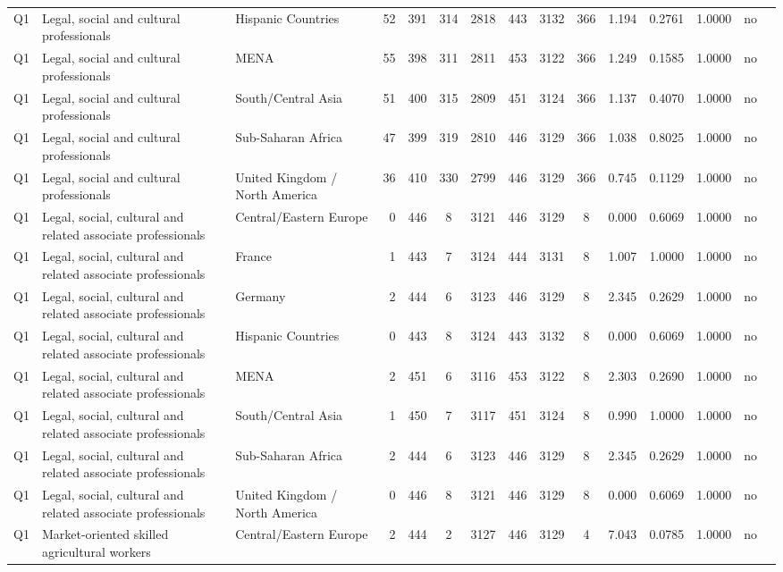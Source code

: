 \begin{longtable}{lllrcccccccccll}
Q1 & Legal, social and cultural professionals & Hispanic Countries & 52 & 391 & 314 & 2818 & 443 & 3132 & 366 & 1.194 & 0.2761 & 1.0000 & no \\
Q1 & Legal, social and cultural professionals & MENA & 55 & 398 & 311 & 2811 & 453 & 3122 & 366 & 1.249 & 0.1585 & 1.0000 & no \\
Q1 & Legal, social and cultural professionals & South/Central Asia & 51 & 400 & 315 & 2809 & 451 & 3124 & 366 & 1.137 & 0.4070 & 1.0000 & no \\
Q1 & Legal, social and cultural professionals & Sub-Saharan Africa & 47 & 399 & 319 & 2810 & 446 & 3129 & 366 & 1.038 & 0.8025 & 1.0000 & no \\
Q1 & Legal, social and cultural professionals & United Kingdom / North America & 36 & 410 & 330 & 2799 & 446 & 3129 & 366 & 0.745 & 0.1129 & 1.0000 & no \\
Q1 & Legal, social, cultural and related associate professionals & Central/Eastern Europe & 0 & 446 & 8 & 3121 & 446 & 3129 & 8 & 0.000 & 0.6069 & 1.0000 & no \\
Q1 & Legal, social, cultural and related associate professionals & France & 1 & 443 & 7 & 3124 & 444 & 3131 & 8 & 1.007 & 1.0000 & 1.0000 & no \\
Q1 & Legal, social, cultural and related associate professionals & Germany & 2 & 444 & 6 & 3123 & 446 & 3129 & 8 & 2.345 & 0.2629 & 1.0000 & no \\
Q1 & Legal, social, cultural and related associate professionals & Hispanic Countries & 0 & 443 & 8 & 3124 & 443 & 3132 & 8 & 0.000 & 0.6069 & 1.0000 & no \\
Q1 & Legal, social, cultural and related associate professionals & MENA & 2 & 451 & 6 & 3116 & 453 & 3122 & 8 & 2.303 & 0.2690 & 1.0000 & no \\
Q1 & Legal, social, cultural and related associate professionals & South/Central Asia & 1 & 450 & 7 & 3117 & 451 & 3124 & 8 & 0.990 & 1.0000 & 1.0000 & no \\
Q1 & Legal, social, cultural and related associate professionals & Sub-Saharan Africa & 2 & 444 & 6 & 3123 & 446 & 3129 & 8 & 2.345 & 0.2629 & 1.0000 & no \\
Q1 & Legal, social, cultural and related associate professionals & United Kingdom / North America & 0 & 446 & 8 & 3121 & 446 & 3129 & 8 & 0.000 & 0.6069 & 1.0000 & no \\
Q1 & Market-oriented skilled agricultural workers & Central/Eastern Europe & 2 & 444 & 2 & 3127 & 446 & 3129 & 4 & 7.043 & 0.0785 & 1.0000 & no \\

\end{longtable}
